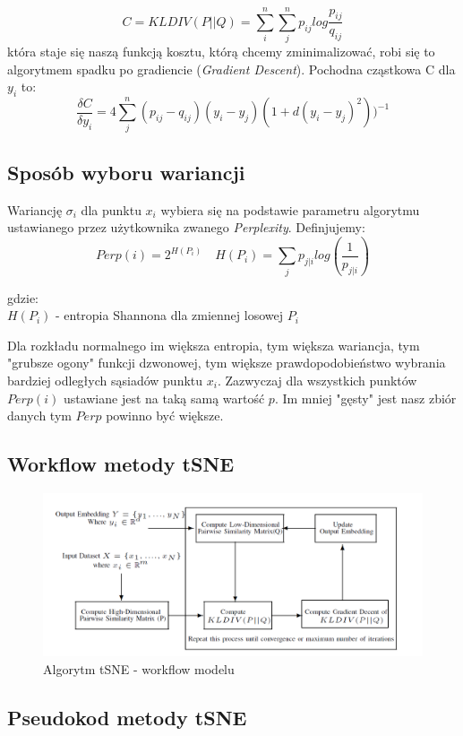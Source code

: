\documentclass{article}
\begin{document}
 \[
     C = KLDIV(P||Q) = \sum_i^n \sum_j^n p_{ij} log \frac{p_{ij}}{q_{ij}}
\]
która staje się naszą funkcją kosztu, którą chcemy zminimalizować, robi się to algorytmem spadku po gradiencie (\textit{Gradient Descent}). Pochodna cząstkowa C dla $y_{i}$ to:
\[
     \frac{\delta C}{\delta y_i} = 4 \sum_j^n (p_{ij} - q_{ij})(y_i - y_j)(1 + d(y_i - y_j)^2))^{-1}
\]

\subsection{Sposób wyboru wariancji}

Wariancję $\sigma_i$ dla punktu $x_i$ wybiera się na podstawie parametru algorytmu ustawianego przez użytkownika zwanego \textit{Perplexity}. Definjujemy:
\[
    Perp(i) = 2^{H(P_i)} \quad H(P_i) = \sum_j p_{j|i} log(\frac{1}{p_{j|i}})
\]

gdzie: \\
$H(P_i)$ - entropia Shannona dla zmiennej losowej $P_i$

Dla rozkładu normalnego im większa entropia, tym większa wariancja, tym "grubsze ogony" funkcji dzwonowej, tym większe prawdopodobieństwo wybrania bardziej odległych sąsiadów punktu $x_i$. Zazwyczaj dla wszystkich punktów $Perp(i)$ ustawiane jest na taką samą wartość $p$. Im mniej "gęsty" jest nasz zbiór danych tym $Perp$ powinno być większe.

\subsection{Workflow metody tSNE}

\begin{figure}[h]
\includegraphics[scale=0.52]{algorithm_TSNE.PNG}
\caption{Algorytm tSNE - workflow modelu}
\end{figure}

\subsection{Pseudokod metody tSNE}
\end{document}
